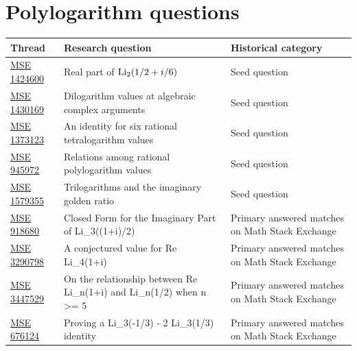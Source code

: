\section{Polylogarithm questions}
\small
\begin{longtable}{@{}p{}p{}p{}@{}}
\toprule Thread & Research question & Historical category\\\midrule
\endhead
\href{https://math.stackexchange.com/questions/1424600/conjecture-re-operatornameli-2-left-frac12-frac-i6-right-frac7-pi2}{MSE 1424600} & Real part of $\operatorname{Li}_2(1/2+i/6)$ & Seed question\\
\href{https://math.stackexchange.com/questions/1430169/conjectured-closed-form-for-operatornameli-2-left-sqrt2-sqrt3-cdot-e}{MSE 1430169} & Dilogarithm values at algebraic complex arguments & Seed question\\
\href{https://math.stackexchange.com/questions/1373123/a-conjectured-identity-for-tetralogarithms-operatornameli-4}{MSE 1373123} & An identity for six rational tetralogarithm values & Seed question\\
\href{https://math.stackexchange.com/questions/945972/relations-connecting-values-of-the-polylogarithm-operatornameli-n-at-ration}{MSE 945972} & Relations among rational polylogarithm values & Seed question\\
\href{https://math.stackexchange.com/questions/1579355/trilogarithm-operatornameli-3z-and-the-imaginary-golden-ratio-i-phi}{MSE 1579355} & Trilogarithms and the imaginary golden ratio & Seed question\\
\href{https://math.stackexchange.com/questions/918680/closed-form-for-the-imaginary-part-of-textli-3-big-frac1i2-big}{MSE 918680} & Closed Form for the Imaginary Part of Li\_3((1+i)/2) & Primary answered matches on Math Stack Exchange\\
\href{https://math.stackexchange.com/questions/3290798/a-conjectured-value-for-operatornamere-operatornameli-4-1-i}{MSE 3290798} & A conjectured value for Re Li\_4(1+i) & Primary answered matches on Math Stack Exchange\\
\href{https://math.stackexchange.com/questions/3447529/on-the-relationship-between-re-operatornameli-n1i-and-operatornameli}{MSE 3447529} & On the relationship between Re Li\_n(1+i) and Li\_n(1/2) when n >= 5 & Primary answered matches on Math Stack Exchange\\
\href{https://math.stackexchange.com/questions/676124/proving-textli-3-left-frac13-right-2-textli-3-left-frac13-rig}{MSE 676124} & Proving a Li\_3(-1/3) - 2 Li\_3(1/3) identity & Primary answered matches on Math Stack Exchange\\

\end{longtable}
